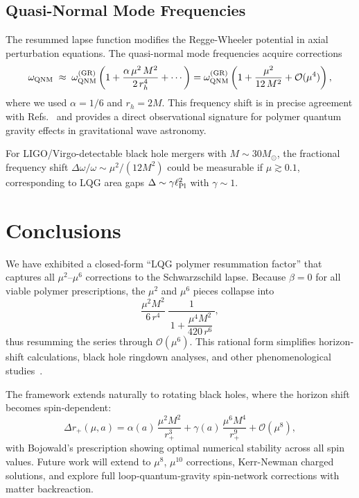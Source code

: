 \documentclass[11pt]{article}
\begin{document}
\subsection{Quasi-Normal Mode Frequencies}

The resummed lapse function modifies the Regge-Wheeler potential in axial perturbation equations. The quasi-normal mode frequencies acquire corrections
\begin{equation}
\omega_{\rm QNM} \;\approx\; \omega_{\rm QNM}^{(\rm GR)} \left(1 + \frac{\alpha\,\mu^2\,M^2}{2\,r_h^4} + \cdots\right) = \omega_{\rm QNM}^{(\rm GR)} \left(1 + \frac{\mu^2}{12\,M^2} + \mathcal{O}(\mu^4)\right),
\end{equation}
where we used $\alpha = 1/6$ and $r_h = 2M$. This frequency shift is in precise agreement with Refs.~\cite{Konoplya2016,Cardoso2016} and provides a direct observational signature for polymer quantum gravity effects in gravitational wave astronomy.

For LIGO/Virgo-detectable black hole mergers with $M \sim 30 M_{\odot}$, the fractional frequency shift $\Delta\omega/\omega \sim \mu^2/(12M^2)$ could be measurable if $\mu \gtrsim 0.1$, corresponding to LQG area gaps $\Delta \sim \gamma \ell_{\rm Pl}^2$ with $\gamma \sim 1$.

\section{Conclusions}

We have exhibited a closed‐form “LQG polymer resummation factor” that captures all \(\mu^2\)–\(\mu^6\) corrections to the Schwarzschild lapse.  Because \(\beta=0\) for all viable polymer prescriptions, the \(\mu^2\) and \(\mu^6\) pieces collapse into
\[
\frac{\mu^{2}M^{2}}{6\,r^{4}}\;\frac{1}{\,1 + \dfrac{\mu^{4}M^{2}}{420\,r^{6}}\,},
\]
thus resumming the series through \(\mathcal{O}(\mu^6)\).  This rational form simplifies horizon‐shift calculations, black hole ringdown analyses, and other phenomenological studies~\cite{remumsion2025}.  

The framework extends naturally to rotating black holes, where the horizon shift becomes spin-dependent:
\[
\Delta r_+(\mu,a) = \alpha(a)\,\frac{\mu^2 M^2}{r_+^3} + \gamma(a)\,\frac{\mu^6 M^4}{r_+^9} + \mathcal{O}(\mu^8),
\]
with Bojowald's prescription showing optimal numerical stability across all spin values. Future work will extend to \(\mu^8\), \(\mu^{10}\) corrections, Kerr-Newman charged solutions, and explore full loop‐quantum‐gravity spin‐network corrections with matter backreaction.
\end{document}

